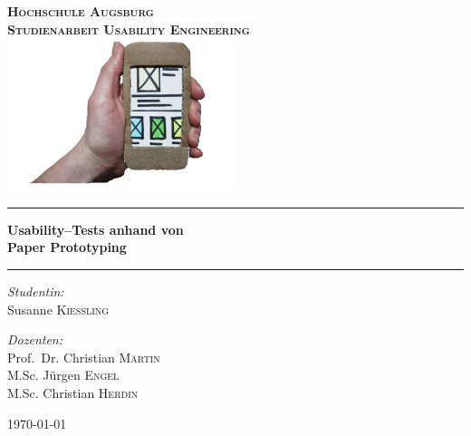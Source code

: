 \begin{titlepage}
\pagecolor{titlepagecolor}
\begin{center}

\bf
\color{titlepagefontcolor}
\textsc{\huge Hochschule Augsburg}\\[1.5cm]
\textsc{\LARGE Studienarbeit Usability Engineering}\\[0.5cm]

\includegraphics[width=0.5\textwidth]{docs/pics/title.png}~\\[1cm]

\rule{\linewidth}{0.5mm}
{\Huge \bfseries Usability--Tests anhand von\\}
{\Huge \bfseries Paper Prototyping\\ }
\rule{\linewidth}{0.5mm}

\noindent
\begin{minipage}[t]{0.4\textwidth}
\begin{flushleft} \Large
\emph{Studentin:}\\
\textnormal{Susanne \textsc{Kießling}}
\end{flushleft}
\end{minipage}%
\begin{minipage}[t]{0.4\textwidth}
\begin{flushright} \Large
\emph{Dozenten:} \\
\textnormal{Prof.\ Dr. Christian \textsc{Märtin}} \\
\textnormal{M.Sc. Jürgen \textsc{Engel}} \\
\textnormal{M.Sc. Christian \textsc{Herdin}}
\end{flushright}
\end{minipage}

\vfill

{\large \today}
\end{center}
\end{titlepage}
\nopagecolor
